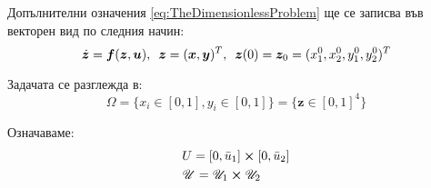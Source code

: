 \begin{frame}{Допълнителни означения}
  \eqref{eq:TheDimensionlessProblem} ще се записва във векторен вид по следния начин:
  \begin{equation*}
    \dot{\boldsymbol{z}} = \boldsymbol{f}(\boldsymbol{z}, \boldsymbol{u}), \hspace{0.5em} \boldsymbol{z} = (\boldsymbol{x}, \boldsymbol{y})^T, \hspace{0.5em} \boldsymbol{z}(0) = \boldsymbol{z}_0 = (x_1^0, x_2^0, y_1^0, y_2^0)^T
  \end{equation*}

Задачата се разглежда в:
  \begin{equation*}
    \Omega = \{x_i \in [0, 1], y_i \in [0, 1]\} = \{\boldsymbol{z} \in [0, 1]^4\}
    \end{equation*}

  Означаваме:
  \begin{equation*}
    \begin{split}
      &U = [0, \bar{u}_1] \cross [0, \bar{u}_2] \\
      &\mathscr{U} = \mathscr{U}_1 \cross \mathscr{U}_2
    \end{split}
  \end{equation*}

\end{frame}

